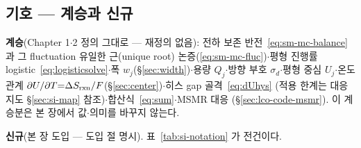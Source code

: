 \subsection*{기호 --- 계승과 신규}
\textbf{계승}(Chapter 1$\cdot$2 정의 그대로 --- 재정의 없음): 전하 보존 반전~\eqref{eq:sm-mc-balance}
과 그 fluctuation 유일한 근(unique root) 논증(\eqref{eq:sm-mc-fluc})$\cdot$평형 진행률 logistic~\eqref{eq:logisticsolve}$\cdot$폭
$w_j$(\S\ref{sec:width})$\cdot$용량 $Q_j$$\cdot$방향 부호 $\sigma_d$$\cdot$평형 중심 $U_j$$\cdot$온도 관계
$\partial U/\partial T{=}\Delta S_{\mathrm{rxn}}/F$(\S\ref{sec:center})$\cdot$히스 gap 골격~\eqref{eq:dUhys}
(적용 한계는 대응 지도 \S\ref{sec:si-map} 참조)$\cdot$합산식~\eqref{eq:sum}$\cdot$MSMR 대응
(\S\ref{sec:lco-code-msmr}). 이 계승분은 본 장에서 값$\cdot$의미를 바꾸지 않는다.

\textbf{신규}(본 장 도입 --- 도입 절 명시). 표~\ref{tab:si-notation} 가 전건이다.

